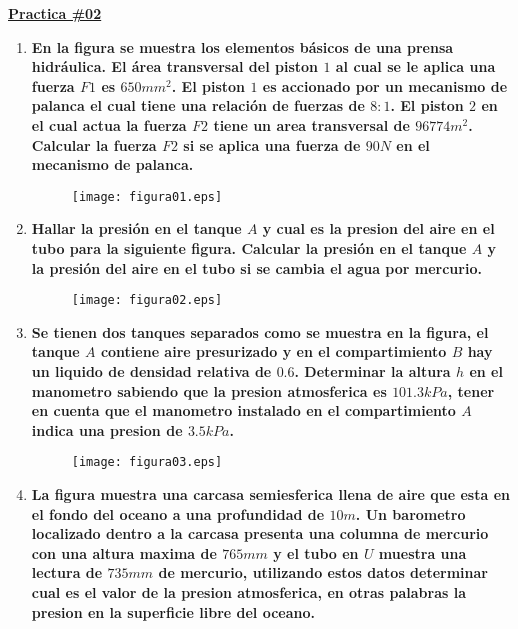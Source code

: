 \documentclass[letter,11pt]{article}
\begin{document}
\begin{center}
    {\large \bf{\underline{Practica \#02}}}
\end{center}
\vspace{0.25cm}

\begin{enumerate}
\item \textbf{En la figura se muestra los elementos básicos de una prensa
hidráulica. El área transversal del piston $1$ al cual se le aplica una fuerza
$F1$ es $650mm^2$. El piston $1$ es accionado por un mecanismo de palanca el
cual tiene una relación de fuerzas de $8:1$. El piston $2$ en el cual actua la
fuerza $F2$ tiene un area transversal de $96774m^2$. Calcular la fuerza $F2$ si
se aplica una fuerza de $90N$ en el mecanismo de palanca.}

\begin{figure}[!h]
\centering
\texttt{[image: figura01.eps]}
\end{figure}

\item \textbf{Hallar la presión en el tanque $A$ y cual es la presion del aire
en el tubo para la siguiente figura. Calcular la presión en el tanque $A$ y la
presión del aire en el tubo si se cambia el agua por mercurio.}

\begin{figure}[!h]
\centering
\texttt{[image: figura02.eps]}
\end{figure}

\item \textbf{Se tienen dos tanques separados como se muestra en la figura, el
tanque $A$ contiene aire presurizado y en el compartimiento $B$ hay un liquido
de densidad relativa de $0.6$. Determinar la altura $h$ en el manometro sabiendo
que la presion atmosferica es $101.3kPa$, tener en cuenta que el manometro
instalado en el compartimiento $A$ indica una presion de $3.5kPa$.}

\begin{figure}[!h]
\centering
\texttt{[image: figura03.eps]}
\end{figure}

\item \textbf{La figura muestra una carcasa semiesferica llena de aire que esta
en el fondo del oceano a una profundidad de $10m$. Un barometro localizado
dentro a la carcasa presenta una columna de mercurio con una altura maxima de
$765mm$ y el tubo en $U$ muestra una lectura de $735mm$ de mercurio, utilizando
estos datos determinar cual es el valor de la presion atmosferica, en otras
palabras la presion en la superficie libre del oceano.}


\end{enumerate}
\end{document}
